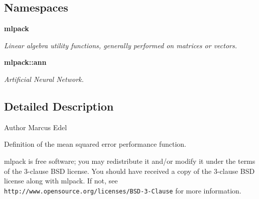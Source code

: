 \subsection*{Namespaces}
\begin{DoxyCompactItemize}
\item 
 \textbf{ mlpack}
\begin{DoxyCompactList}\small\item\em Linear algebra utility functions, generally performed on matrices or vectors. \end{DoxyCompactList}\item 
 \textbf{ mlpack\+::ann}
\begin{DoxyCompactList}\small\item\em Artificial Neural Network. \end{DoxyCompactList}\end{DoxyCompactItemize}


\subsection{Detailed Description}
\begin{DoxyAuthor}{Author}
Marcus Edel
\end{DoxyAuthor}
Definition of the mean squared error performance function.

mlpack is free software; you may redistribute it and/or modify it under the terms of the 3-\/clause B\+SD license. You should have received a copy of the 3-\/clause B\+SD license along with mlpack. If not, see {\tt http\+://www.\+opensource.\+org/licenses/\+B\+S\+D-\/3-\/\+Clause} for more information. 